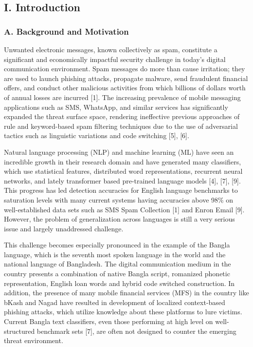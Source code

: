 \subsection{I. Introduction}\label{i.-introduction}

\subsubsection{A. Background and
Motivation}\label{a.-background-and-motivation}

Unwanted electronic messages, known collectively as spam, constitute a
significant and economically impactful security challenge in today's
digital communication environment. Spam messages do more than cause
irritation; they are used to launch phishing attacks, propagate malware,
send fraudulent financial offers, and conduct other malicious activities
from which billions of dollars worth of annual losses are incurred
{[}1{]}. The increasing prevalence of mobile messaging applications such
as SMS, WhatsApp, and similar services has significantly expanded the
threat surface space, rendering ineffective previous approaches of rule
and keyword-based spam filtering techniques due to the use of
adversarial tactics such as linguistic variations and code switching
{[}5{]}, {[}6{]}.

Natural language processing (NLP) and machine learning (ML) have seen an
incredible growth in their research domain and have generated many
classifiers, which use statistical features, distributed word
representations, recurrent neural networks, and lately transformer based
pre-trained language models {[}4{]}, {[}7{]}, {[}9{]}. This progress has
led detection accuracies for English language benchmarks to saturation
levels with many current systems having accuracies above 98\% on
well-established data sets such as SMS Spam Collection {[}1{]} and Enron
Email {[}9{]}. However, the problem of generalization across languages
is still a very serious issue and largely unaddressed challenge.

This challenge becomes especially pronounced in the example of the
Bangla language, which is the seventh most spoken language in the world
and the national language of Bangladesh. The digital communication
medium in the country presents a combination of native Bangla script,
romanized phonetic representation, English loan words and hybrid code
switched construction. In addition, the presence of many mobile
financial services (MFS) in the country like bKash and Nagad have
resulted in development of localized context-based phishing attacks,
which utilize knowledge about these platforms to lure victims. Current
Bangla text classifiers, even those performing at high level on
well-structured benchmark sets {[}7{]}, are often not designed to
counter the emerging threat environment.

